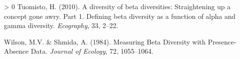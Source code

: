 \documentclass[11pt]{article}
\newlength{\cslhangindent}
\newenvironment{CSLReferences}[3] %
 {%
  \setlength{\parindent}{0pt}
  \ifodd #1 \everypar{\setlength{\hangindent}{\cslhangindent}}\ignorespaces\fi
  \ifnum #2 > 0
  \setlength{\parskip}{#2\baselineskip}
  \fi
 }%
 {}
\begin{document}
\begin{CSLReferences}{1}{0}
\leavevmode\hypertarget{ref-Tuomisto2010DivBet}{}%
Tuomisto, H. (2010). A diversity of beta diversities: Straightening up a
concept gone awry. Part 1. Defining beta diversity as a function of
alpha and gamma diversity. \emph{Ecography}, 33, 2--22.

\leavevmode\hypertarget{ref-Wilson1984MeaBet}{}%
Wilson, M.V. \& Shmida, A. (1984). Measuring Beta Diversity with
Presence-Absence Data. \emph{Journal of Ecology}, 72, 1055--1064.

\end{CSLReferences}
\end{document}
